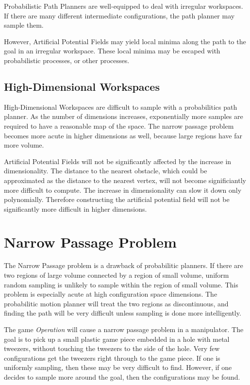 \documentclass{article}
\begin{document}
Probabilistic Path Planners are well-equipped to deal with irregular workspaces.
If there are many different intermediate configurations, the path planner
	may sample them.

However, Artificial Potential Fields may yield local minima along the path to the
	goal in an irregular workspace.
These local minima may be escaped with probabilistic processes, or other processes.

\subsection{High-Dimensional Workspaces}

High-Dimensional Workspaces are difficult to sample with a probabilitics
	path planner.
As the number of dimensions increases, exponentially more samples are required to have
	a reasonable map of the space.
The narrow passage problem becomes more acute in higher dimensions as well, because
	large regions have far more volume.

Artificial Potential Fields will not be significantly affected by the increase
	in dimensionality.
The distance to the nearest obstacle, which could be approximated as the distance to the
	nearest vertex, will not become significiantly more difficult to compute.
The increase in dimensionality can slow it down only polynomially.
Therefore constructing the artificial potential field will not be significantly more
	difficult in higher dimensions.

\section{Narrow Passage Problem}

The Narrow Passage problem is a drawback of probabilitic planners.
If there are two regions of large volume connected by a region of small volume,
	uniform random sampling is unlikely to sample within the region of small volume.
This problem is especially acute at high configuration space dimensions.
The probabilitic motion planner will treat the two regions as discontinuous, and finding
	the path will be very difficult unless sampling is done more intelligently.

The game \emph{Operation} will cause a narrow passage problem in a manipulator.
The goal is to pick up a small plastic game piece embedded in a hole with metal tweezers, 
	without touching the tweezers to the side of the hole.
Very few configurations get the tweezers right through to the game piece.
If one is uniformly sampling, then these may be very difficult to find.
However, if one decides to sample more around the goal, then the configurations may be
	found.
\end{document}
